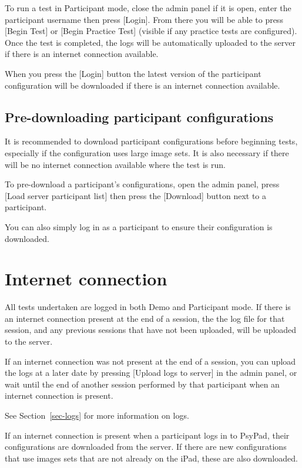 \documentclass{article}
\begin{document}
To run a test in Participant mode, close the admin panel if it is open,
enter the participant username then press [Login].
From there you will be able to press [Begin Test] or [Begin Practice
Test] (visible if any practice tests are configured).
Once the test is completed, the logs will be automatically uploaded to
the server if there is an internet connection available.

When you press the [Login] button the latest version of the participant configuration will be downloaded if there is an internet connection available.

\subsection{Pre-downloading participant configurations}

It is recommended to download participant configurations before beginning tests,
especially if the configuration uses large image sets.
It is also necessary if there will be no internet connection available
where the test is run.

To pre-download a participant's configurations, open the admin panel, press 
[Load server participant list] then press the [Download] button next to a participant.

You can also simply log in as a participant to ensure their configuration is downloaded.

\section{Internet connection}

All tests undertaken are logged in both Demo and Participant mode.
If there is an internet connection present at the end of a session, the
the log file for that session, and any previous sessions that have not
been uploaded, will be uploaded to the server.

If an internet connection was not present at the end of a session, you
can upload the logs at a later date by pressing [Upload logs to server]
in the admin panel, or wait until the end of another session performed
by that participant when an internet connection is present.

See Section~\ref{sec-logs} for more information on logs.

If an internet connection is present when a participant logs in to
PsyPad, their configurations are downloaded from the server.
If there are new configurations that use images sets that are not
already on the iPad, these are also downloaded.
\end{document}
